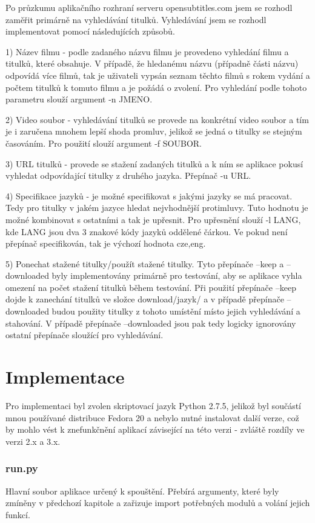 \documentclass[a4paper,12]{article}
\begin{document}
Po průzkumu aplikačního rozhraní serveru opensubtitles.com jsem se rozhodl zaměřit primárně na vyhledávání titulků. Vyhledávání jsem se rozhodl implementovat pomocí následujících způsobů.

1) Název filmu - podle zadaného názvu filmu je provedeno vyhledání filmu a titulků, které obsahuje. V případě, že hledanému názvu (případně části názvu) odpovídá více filmů, tak je uživateli vypsán seznam těchto filmů s rokem vydání a počtem titulků k tomuto filmu a je požádá o zvolení. Pro vyhledání podle tohoto parametru slouží argument -n JMENO.

2) Video soubor - vyhledávání titulků se provede na konkrétní video soubor a tím je i zaručena mnohem lepší shoda promluv, jelikož se jedná o titulky se stejným časováním. Pro použití slouží argument -f SOUBOR.

3) URL titulků - provede se stažení zadaných titulků a k ním se aplikace pokusí vyhledat odpovídající titulky z druhého jazyka. Přepínač -u URL.

4) Specifikace jazyků - je možné specifikovat s jakými jazyky se má pracovat. Tedy pro titulky v jakém jazyce hledat nejvhodnější protimluvy. Tuto hodnotu je možné kombinovat s ostatními a tak je upřesnit. Pro upřesnění slouží -l LANG, kde LANG jsou dva 3 znakové kódy jazyků oddělené čárkou. Ve pokud není přepínač specifikován, tak je výchozí hodnota cze,eng.

5) Ponechat stažené titulky/použít stažené titulky. Tyto přepínače --keep a --downloaded byly implementovány primárně pro testování, aby se aplikace vyhla omezení na počet stažení titulků během testování. Při použití přepínače --keep dojde k zanechání titulků ve složce download/jazyk/ a v případě přepínače --downloaded budou použity titulky z tohoto umístění místo jejich vyhledávání a stahování. V případě přepínače --downloaded jsou pak tedy logicky ignorovány ostatní přepínače sloužící pro vyhledávání.


\pagebreak

\part*{Implementace}
Pro implementaci byl zvolen skriptovací jazyk Python 2.7.5, jelikož byl součástí mnou používané distribuce Fedora 20 a nebylo nutné instalovat další verze, což by mohlo vést k znefunkčnění aplikací závisející na této verzi - zvláště rozdíly ve verzi 2.x a 3.x.

\section*{run.py}
Hlavní soubor aplikace určený k spouštění. Přebírá argumenty, které byly zmíněny v předchozí kapitole a zařizuje import potřebných modulů a volání jejich funkcí.
\end{document}
